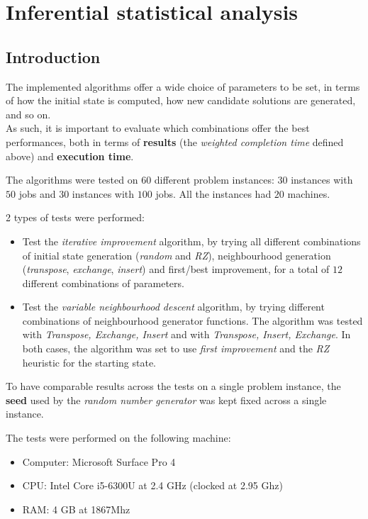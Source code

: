 \documentclass[
12pt,
a4paper,
oneside,
headinclude,
footinclude]{article}
\theoremstyle{definition} %
\begin{document}
\section{Inferential statistical analysis}

\subsection{Introduction}
The implemented algorithms offer a wide choice of parameters to be set, in terms of how the initial state is computed, how new candidate solutions are generated, and so on.\\
As such, it is important to evaluate which combinations offer the best performances, both in terms of \textbf{results} (the \textit{weighted completion time} defined above) and \textbf{execution time}.

The algorithms were tested on $60$ different problem instances: $30$ instances with $50$ jobs and $30$ instances with $100$ jobs.
All the instances had $20$ machines. 

2 types of tests were performed:
\begin{itemize}
    \item Test the \textit{iterative improvement} algorithm, by trying all different combinations of initial state generation (\textit{random} and \textit{RZ}), neighbourhood generation (\textit{transpose}, \textit{exchange}, \textit{insert}) and first/best improvement, for a total of $12$ different combinations of parameters.
    
    \item Test the \textit{variable neighbourhood descent} algorithm, by trying different combinations of neighbourhood generator functions. The algorithm was tested with \textit{Transpose, Exchange, Insert} and with \textit{Transpose, Insert, Exchange}. In both cases, the algorithm was set to use \textit{first improvement} and the \textit{RZ} heuristic for the starting state.
\end{itemize}

To have comparable results across the tests on a single problem instance, the \textbf{seed} used by the \textit{random number generator} was kept fixed across a single instance.

The tests were performed on the following machine:
\begin{itemize}
    \item Computer: Microsoft Surface Pro 4
    \item CPU: Intel Core i5-6300U at 2.4 GHz (clocked at 2.95 Ghz)
    \item RAM: 4 GB at 1867Mhz
\end{itemize}
 
\end{document}

